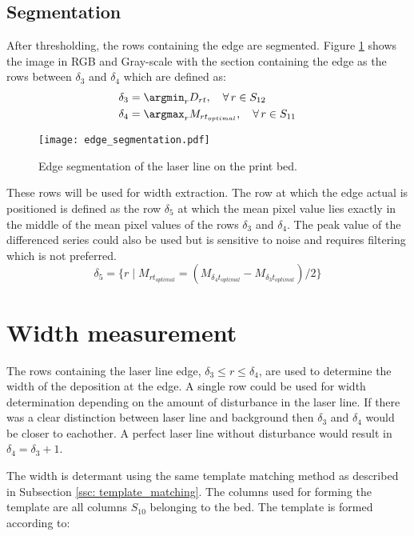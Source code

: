 \subsection*{Segmentation}
After thresholding, the rows containing the edge are segmented. Figure \ref{fig: edge_segmentation} shows the image in RGB and Gray-scale with the section containing the edge as the rows between $\delta_3$ and $\delta_4$ which are defined as:
\begin{align}
\delta_3 &= \argmin_r D_{rt}, \quad \forall \, r \in S_{12} \\
\delta_4 &= \argmax_r M_{rt_{optimal}}, \quad \forall \, r \in S_{11}
\end{align}
\begin{figure}[!ht]
\centering
\texttt{[image: edge\_segmentation.pdf]} 
\caption{Edge segmentation of the laser line on the print bed.}
\label{fig: edge_segmentation}
\end{figure}
These rows will be used for width extraction. The row at which the edge actual is positioned is defined as the row $\delta_5$ at which the mean pixel value lies exactly in the middle of the mean pixel values of the rows $\delta_3$ and $\delta_4$. The peak value of the differenced series could also be used but is sensitive to noise and requires filtering which is not preferred. 
\begin{equation}
\delta_5 = \{r \mid M_{rt_{optimal}} = \left( M_{\delta_4t_{optimal}} - M_{\delta_3t_{optimal}} \right) / 2 \}
\end{equation}

\section{Width measurement}
The rows containing the laser line edge, $\delta_3 \leq r \leq \delta_4$, are used to determine the width of the deposition at the edge. A single row could be used for width determination depending on the amount of disturbance in the laser line. If there was a clear distinction between laser line and background then $\delta_3$ and $\delta_4$ would be closer to eachother. A perfect laser line without disturbance would result in $\delta_4 = \delta_3 +1$.

The width is determant using the same template matching method as described in Subsection \ref{ssc: template_matching}. The columns used for forming the template are all columns $S_{10}$ belonging to the bed. The template is formed according to:

